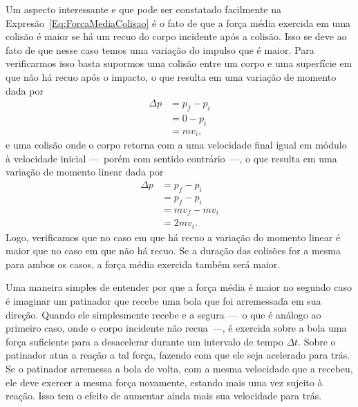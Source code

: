 Um aspecto interessante e que pode ser constatado facilmente na Expresão~\ref{Eq:ForcaMediaColisao} é o fato de que a força média exercida em uma colisão é maior se há um recuo do corpo incidente após a colisão. Isso se deve ao fato de que nesse caso temos uma variação do impulso que é maior. Para verificarmos isso basta supormos uma colisão entre um corpo e uma superfície em que não há recuo após o impacto, o que resulta em uma variação de momento dada por
\begin{align}
    \Delta p &= p_f - p_i \\
    &= 0 - p_i \\
    &= m v_i,
\end{align}
%
e uma colisão onde o corpo retorna com a uma velocidade final igual em módulo à velocidade inicial ---~porém com sentido contrário~---, o que resulta em uma variação de momento linear dada por
\begin{align}
    \Delta p &= p_f - p_i \\
    &= p_f - p_i \\
    &= mv_f - mv_i \\
    &= 2mv_i.
\end{align}
%
Logo, verificamos que no caso em que há recuo a variação do momento linear é maior que no caso em que não há recuo. Se a duração das colisões for a mesma para ambos os casos, a força média exercida também será maior.

Uma maneira simples de entender por que a força média é maior no segundo caso é imaginar um patinador que recebe uma bola que foi arremessada em sua direção. Quando ele simplesmente recebe e a segura ---~o que é análogo ao primeiro caso, onde o corpo incidente não recua~---, é exercida sobre a bola uma força suficiente para a desacelerar durante um intervalo de tempo $\Delta t$. Sobre o patinador atua a reação a tal força, fazendo com que ele seja acelerado para trás. Se o patinador arremessa a bola de volta, com a mesma velocidade que a recebeu, ele deve exercer a mesma força novamente, estando mais uma vez sujeito à reação. Isso tem o efeito de aumentar ainda mais sua velocidade para trás.


